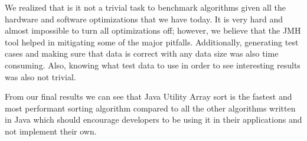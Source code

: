 We realized that is it not a trivial task to benchmark algorithms given all the hardware and software optimizations that we have today. It is very hard and almost impossible to turn all optimizations off; however, we believe that the JMH tool helped in mitigating some of the major pitfalls. Additionally, generating test cases and making sure that data is correct with any data size was also time consuming. Also, knowing what test data to use in order to see interesting results was also not trivial.

From our final results we can see that Java Utility Array sort is the fastest and most performant sorting algorithm compared to all the other algorithms written in Java which should encourage developers to be using it in their applications and not implement their own.